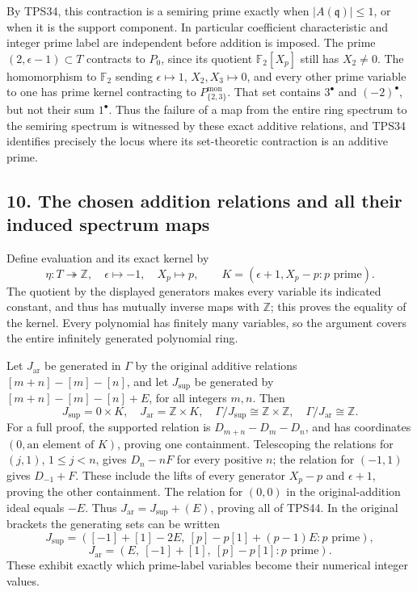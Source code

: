 \documentclass[
  10pt,
]{article}
\begin{document}
By TPS34, this contraction is a semiring prime exactly when
\(|A(\mathfrak q)|\le1\), or when it is the support component. In
particular coefficient characteristic and integer prime label are
independent before addition is imposed. The prime
\((2,\epsilon-1)\subset T\) contracts to \(P_0\), since its quotient
\(\mathbb F_2[X_p]\) still has \(X_2\ne0\). The homomorphism to
\(\mathbb F_2\) sending \(\epsilon\mapsto1\), \(X_2,X_3\mapsto0\), and
every other prime variable to one has prime kernel contracting to
\(P_{\{2,3\}}^{\mathrm{mon}}\). That set contains \(3^\bullet\) and
\((-2)^\bullet\), but not their sum \(1^\bullet\). Thus the failure of a
map from the entire ring spectrum to the semiring spectrum is witnessed
by these exact additive relations, and TPS34 identifies precisely the
locus where its set-theoretic contraction is an additive prime.

\subsection{10. The chosen addition relations and all their induced
spectrum
maps}\label{the-chosen-addition-relations-and-all-their-induced-spectrum-maps}

Define evaluation and its exact kernel by \[
\eta:T\twoheadrightarrow\mathbb Z,\quad
\epsilon\mapsto-1,\quad X_p\mapsto p,\qquad
K=(\epsilon+1,X_p-p:p\text{ prime}).
\tag{TPS43}
\] The quotient by the displayed generators makes every variable its
indicated constant, and thus has mutually inverse maps with
\(\mathbb Z\); this proves the equality of the kernel. Every polynomial
has finitely many variables, so the argument covers the entire
infinitely generated polynomial ring.

Let \(J_{\mathrm{ar}}\) be generated in \(\Gamma\) by the original
additive relations \([m+n]-[m]-[n]\), and let \(J_{\mathrm{sup}}\) be
generated by \([m+n]-[m]-[n]+E\), for all integers \(m,n\). Then \[
\boxed{J_{\mathrm{sup}}=0\times K,\quad
J_{\mathrm{ar}}=\mathbb Z\times K,\quad
\Gamma/J_{\mathrm{sup}}\cong\mathbb Z\times\mathbb Z,\quad
\Gamma/J_{\mathrm{ar}}\cong\mathbb Z.}
\tag{TPS44}
\] For a full proof, the supported relation is \(D_{m+n}-D_m-D_n\), and
has coordinates \((0,\text{an element of }K)\), proving one containment.
Telescoping the relations for \((j,1)\), \(1\le j<n\), gives \(D_n-nF\)
for every positive \(n\); the relation for \((-1,1)\) gives
\(D_{-1}+F\). These include the lifts of every generator \(X_p-p\) and
\(\epsilon+1\), proving the other containment. The relation for
\((0,0)\) in the original-addition ideal equals \(-E\). Thus
\(J_{\mathrm{ar}}=J_{\mathrm{sup}}+(E)\), proving all of TPS44. In the
original brackets the generating sets can be written \[
J_{\mathrm{sup}}=([-1]+[1]-2E,\ [p]-p[1]+(p-1)E:p\text{ prime}),
\] \[
J_{\mathrm{ar}}=(E,\ [-1]+[1],\ [p]-p[1]:p\text{ prime}).
\tag{TPS45}
\] These exhibit exactly which prime-label variables become their
numerical integer values.
\end{document}
